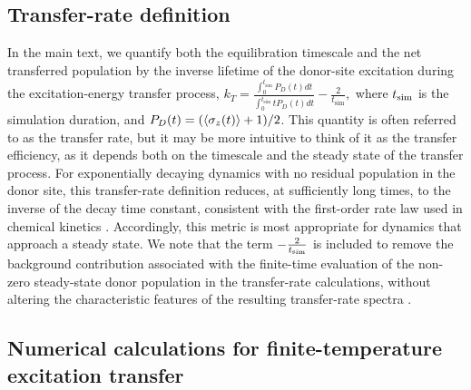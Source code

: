 \documentclass[%
reprint,
superscriptaddress,
amsmath,amssymb,
aps,
prl,
floatfix,
]{revtex4-2}
\begin{document}
\subsection*{Transfer-rate definition}

In the main text, we quantify both the equilibration timescale and the net transferred population by the inverse lifetime of the donor-site excitation during the excitation-energy transfer process, $k_T=\frac{\int_{0}^{t_\text{sim}} P_D(t)dt}{\int_{0}^{t_\text{sim}} t P_D(t)dt} - \frac{2}{t_\text{sim}},$
where $t_{\rm sim}$ is the simulation duration, and $P_D(t)=(\braket{\sigma_z(t)}+1)/2$. This quantity is often referred to as the transfer rate, but it may be more intuitive to think of it as the transfer efficiency, as it depends both on the timescale and the steady state of the transfer process. For exponentially decaying dynamics with no residual population in the donor site, this transfer-rate definition reduces, at sufficiently long times, to the inverse of the decay time constant, consistent with the first-order rate law used in chemical kinetics \cite{schlawin2021electrontransfer,padilla2025delocalizedexcitationtransferopen}. Accordingly, this metric is most appropriate for dynamics that approach a steady state. We note that the term $-\frac{2}{t_{\rm sim}}$ is included to remove the background contribution associated with the finite-time evaluation of the non-zero steady-state donor population in the transfer-rate calculations, without altering the characteristic features of the resulting transfer-rate spectra \cite{so2024electrontransfer,so2025multimode}.

\subsection*{Numerical calculations for finite-temperature excitation transfer}\label{app_numeric}
\end{document}
